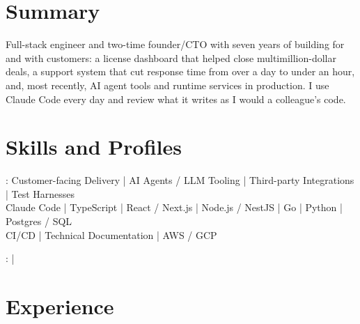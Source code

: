 \documentclass[print]{jack-resume}
\begin{document}
\pagecolor{darkmodeBackground}


\begin{minipage}[t][1cm][t]{.03\textwidth}
    \hfill
\end{minipage}

\section{Summary}
Full-stack engineer and two-time founder/CTO with seven years of building for and with customers: a license dashboard that helped close multimillion-dollar deals, a support system that cut response time from over a day to under an hour, and, most recently, AI agent tools and runtime services in production. I use Claude Code every day and review what it writes as I would a colleague's code.
\sectionsep

\section{Skills and Profiles}
:
Customer-facing Delivery \hfill | \hfill
AI Agents / LLM Tooling \hfill | \hfill
Third-party Integrations \hfill | \hfill
Test Harnesses \\
\hspace{1.0cm} Claude Code \hfill | \hfill
TypeScript \hfill | \hfill
React / Next.js \hfill | \hfill
Node.js / NestJS \hfill | \hfill
Go \hfill | \hfill
Python \hfill | \hfill
Postgres / SQL \\
\hspace{1.0cm} CI/CD \hfill | \hfill
Technical Documentation \hfill | \hfill
AWS / GCP \\

\raggedright{
    :
      \href{https://www.linkedin.com/in/jack-sturtevant/}{ \ExternalLink} |
     \href{https://github.com/jacksturt}{ \ExternalLink}}

\section{Experience}
\end{document}
